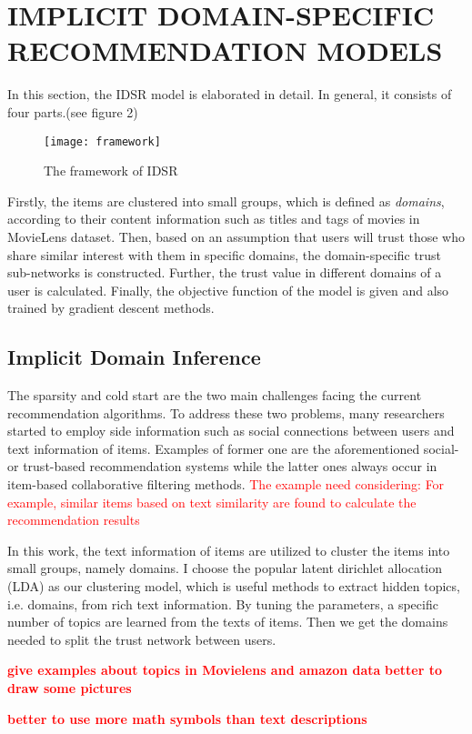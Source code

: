 \section{IMPLICIT DOMAIN-SPECIFIC RECOMMENDATION MODELS}
In this section, the IDSR model is elaborated in detail. In general, it consists of four parts.(see figure 2)
\begin{figure}[h]
	\caption{The framework of IDSR}
	\centering
	\texttt{[image: framework]}
\end{figure}
Firstly, the items are clustered into small groups, which is defined as \emph{domains}, according to their content information such as titles and tags of movies in MovieLens dataset. Then, based on an assumption that users will trust those who share similar interest with them in specific domains, the domain-specific trust sub-networks is constructed. Further, the trust value in different domains of a user is calculated. Finally, the objective function of the model is given and also trained by gradient descent methods.
\subsection{Implicit Domain Inference}
The sparsity and cold start are the two main challenges facing the current recommendation algorithms. To address these two problems, many researchers started to employ side information such as social connections between users and text information of items. Examples of former one are the aforementioned social- or trust-based recommendation systems while the latter ones always occur in item-based collaborative filtering methods. \textcolor{red}{The example need considering: For example, similar items based on text similarity are found to calculate the recommendation results}

In this work, the text information of items are utilized to cluster the items into small groups, namely domains. I choose the popular latent dirichlet allocation (LDA)\cite{blei2003latent} as our clustering model, which is useful methods to extract hidden topics, i.e. domains, from rich text information. By tuning the parameters, a specific number of topics are learned from the texts of items. Then we get the domains needed to split the trust network between users.

\textcolor{red}{\textbf{give examples about topics in Movielens and amazon data}}
\textcolor{red}{\textbf{better to draw some pictures}}

\textcolor{red}{\textbf{better to use more math symbols than text descriptions}}

